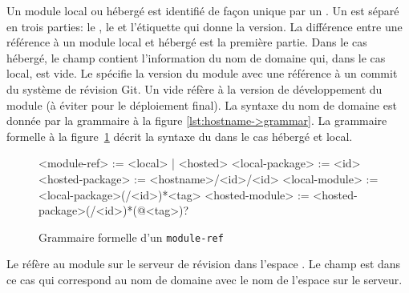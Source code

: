 Un module local ou hébergé est identifié de façon unique par un
.  Un  est séparé en trois parties: le
, le  et l'étiquette qui donne la version.  La
différence entre une référence à un module local et hébergé est la première
partie. Dans le cas hébergé, le champ  contient l'information
du nom de domaine qui, dans le cas local, est vide.  Le 
spécifie la version du module avec une référence à un commit du système de
révision Git. Un  vide réfère à la version de développement du
module (à éviter pour le déploiement final).  La syntaxe du nom de domaine est
donnée par la grammaire à la figure \ref{lst:hostname->grammar}.  La grammaire
formelle à la figure~\ref{lst:module-ref->grammar} décrit la syntaxe du
 dans le cas hébergé et local.\\

\begin{figure}[ht]
  \lstset{frame=single}
  \begin{mplisting}{0.8}
<module-ref>       := <local> | <hosted>
<local-package>    := <id>
<hosted-package>   := <hostname>/<id>/<id>
<local-module>     := <local-package>(/<id>)*<tag>
<hosted-module>    := <hosted-package>(/<id>)*(@<tag>)?
\end{mplisting}
  \caption{Grammaire formelle d'un \texttt{module-ref}}
  \label{lst:module-ref->grammar}
\end{figure}

Le   réfère
au module  sur le serveur de révision 
dans l'espace . Le champ  est dans ce
cas  qui correspond au nom de domaine avec
le nom de l'espace sur le serveur.


